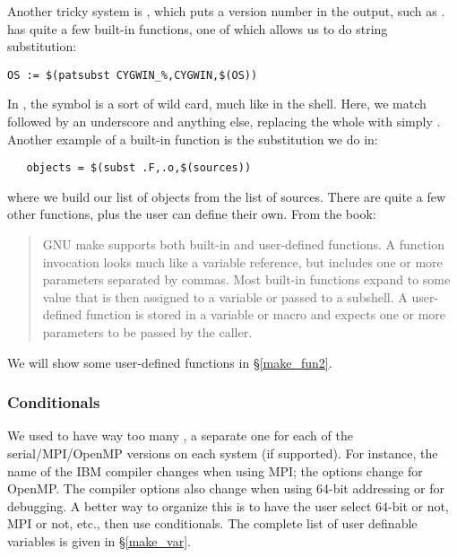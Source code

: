 Another tricky system is , which puts a version number
in the  output, such as .  has
quite a few built-in functions, one of which allows us to do string
substitution:
\begin{verbatim}
OS := $(patsubst CYGWIN_%,CYGWIN,$(OS))
\end{verbatim}
In , the \code{\%} symbol is a sort of wild card, much
like \code{*} in the shell.
Here, we match  followed by an underscore and anything else,
replacing the whole with simply . Another example of a
built-in function is the substitution we do in:
\begin{verbatim}
   objects = $(subst .F,.o,$(sources))
\end{verbatim}
where we build our list of objects from the list of sources.
There are quite a few other functions, plus the user can define
their own. From the book\cite{GMAKE}:
\begin{quote}
GNU make supports both built-in and user-defined functions.
A function invocation looks much like a variable reference, but
includes one or more parameters separated by commas.  Most built-in
functions expand to some value that is then assigned to a variable
or passed to a subshell. A user-defined function is stored in a
variable or macro and expects one or more parameters to be passed
by the caller.
\end{quote}
We will show some user-defined functions in \S\ref{make_fun2}.

\subsubsection{Conditionals}

We used to have way too many , a separate one for each
of the serial/MPI/OpenMP versions on each system (if supported). For
instance, the name of the IBM compiler changes when using MPI; the
options change for OpenMP. The compiler options also change when using
64-bit addressing or for debugging.
A better way to organize this is to have the user select 64-bit or not, MPI
or not, etc., then use conditionals. The complete list of
user definable  variables is given in \S\ref{make_var}.

